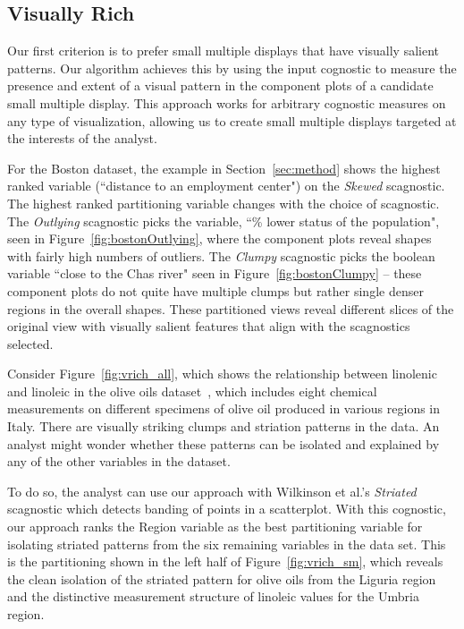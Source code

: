 \subsection{Visually Rich}
Our first criterion is to prefer small multiple displays that have visually salient patterns. Our algorithm achieves this by using the input cognostic to measure the presence and extent of a visual pattern in the component plots of a candidate small multiple display. This approach works for arbitrary cognostic measures on any type of visualization, allowing us to create small multiple displays targeted at the interests of the analyst. 

For the Boston dataset, the example in Section~\ref{sec:method} shows the highest ranked variable (``distance to an employment center") on the \emph{Skewed} scagnostic. The highest ranked partitioning variable changes with the choice of scagnostic. The \emph{Outlying} scagnostic picks the variable, ``\% lower status of the population", seen in Figure~\ref{fig:bostonOutlying}, where the component plots reveal shapes with fairly high numbers of outliers. The \emph{Clumpy} scagnostic picks the boolean variable ``close to the Chas river" seen in Figure~\ref{fig:bostonClumpy} -- these component plots do not quite have multiple clumps but rather single denser regions in the overall shapes. These partitioned views reveal different slices of the original view with visually salient features that align with the scagnostics selected.
 
Consider Figure~\ref{fig:vrich_all}, which shows the relationship between linolenic and linoleic in the olive oils dataset~\cite{Forina1983}, which includes eight chemical measurements on different specimens of olive oil produced in various regions in Italy. There are visually striking clumps and striation patterns in the data. An analyst might wonder whether these patterns can be isolated and explained by any of the other variables in the dataset.

To do so, the analyst can use our approach with Wilkinson et al.'s \emph{Striated} scagnostic which detects banding of points in a scatterplot. With this cognostic, our approach ranks the Region variable as the best partitioning variable for isolating striated patterns from the six remaining variables in the data set. This is the partitioning shown in the left half of Figure~\ref{fig:vrich_sm}, which reveals the clean isolation of the striated pattern for olive oils from the Liguria region and the distinctive measurement structure of linoleic values for the Umbria region.

